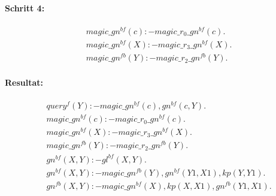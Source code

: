 \documentclass[12pt,a4paper]{amsart}
\begin{document}
\begin{aufgabe1}
\paragraph{Schritt 4:}

\begin{align*}
&magic\_gn^{bf}(c) :- magic\_r_0\_gn^{bf}(c). \\
&magic\_gn^{bf}(X) :- magic\_r_3\_gn^{bf}(X). \\
&magic\_gn^{fb}(Y) :- magic\_r_2\_gn^{fb}(Y). 
\end{align*}

\paragraph{Resultat:}
\begin{align*}
&query^{f}(Y) :- magic\_gn^{bf}(c), gn^{bf}(c,Y). \\
&magic\_gn^{bf}(c) :- magic\_r_0\_gn^{bf}(c). \\
&magic\_gn^{bf}(X) :- magic\_r_3\_gn^{bf}(X). \\
&magic\_gn^{fb}(Y) :- magic\_r_2\_gn^{fb}(Y). \\
&gn^{bf}(X,Y) :- gl^{bf}(X,Y). \\
&gn^{bf}(X,Y) :- magic\_gn^{fb}(Y), gn^{bf}(Y1,X1), kp(Y,Y1). \\
&gn^{fb}(X,Y) :- magic\_gn^{bf}(X), kp(X,X1), gn^{fb}(Y1,X1).
\end{align*}


\end{aufgabe1}
\end{document}
